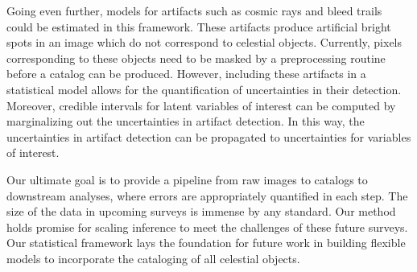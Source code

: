 Going even further, models for artifacts such as cosmic rays and bleed trails~\cite{Desai_2016} could be estimated in this framework.
These artifacts produce artificial bright spots in an image which do not correspond to celestial objects.
Currently, pixels corresponding to these objects need to be masked by a preprocessing routine before a catalog can be produced. 
However, including these artifacts in a statistical model allows for the quantification of uncertainties in their detection. 
Moreover, credible intervals for latent variables of interest can be computed by marginalizing out the uncertainties in artifact detection. 
In this way, the uncertainties in artifact detection can be propagated to uncertainties for variables of interest. 

Our ultimate goal is to provide a pipeline from raw images to catalogs to downstream analyses, where errors are appropriately quantified in each step. 
The size of the data in upcoming surveys is immense by any standard. 
Our method holds promise for scaling inference to meet the challenges of these future surveys. 
Our statistical framework lays the foundation for future work in building flexible models to incorporate the cataloging of all celestial objects. 




